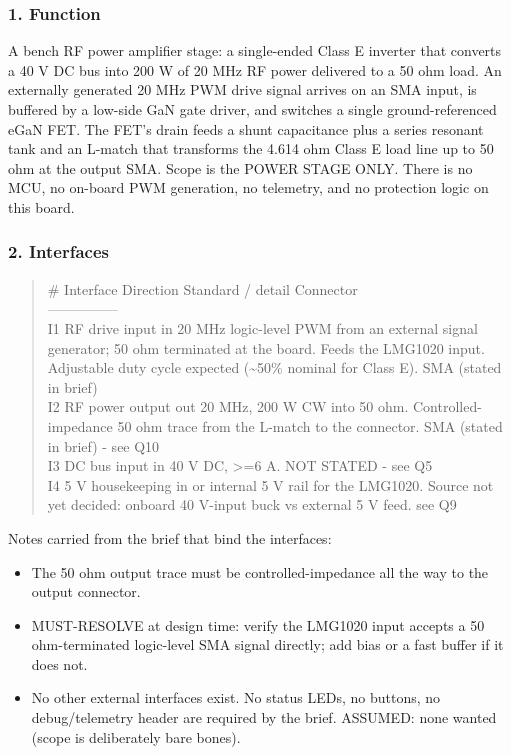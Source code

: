 \documentclass[11pt,a4paper]{article}
\begin{document}
\subsubsection*{1. Function}
A bench RF power amplifier stage: a single-ended Class E inverter that converts a 40 V DC bus into 200 W of 20 MHz RF power delivered to a 50 ohm load. An externally generated 20 MHz PWM drive signal arrives on an SMA input, is buffered by a low-side GaN gate driver, and switches a single ground-referenced eGaN FET. The FET's drain feeds a shunt capacitance plus a series resonant tank and an L-match that transforms the 4.614 ohm Class E load line up to 50 ohm at the output SMA. Scope is the POWER STAGE ONLY. There is no MCU, no on-board PWM generation, no telemetry, and no protection logic on this board.

\subsubsection*{2. Interfaces}
\begin{quote}\small\ttfamily\raggedright
\textbar{} \# \textbar{} Interface \textbar{} Direction \textbar{} Standard / detail \textbar{} Connector \textbar{}\\
\textbar{}---\textbar{}---\textbar{}---\textbar{}---\textbar{}---\textbar{}\\
\textbar{} I1 \textbar{} RF drive input \textbar{} in \textbar{} 20 MHz logic-level PWM from an external signal generator; 50 ohm terminated at the board. Feeds the LMG1020 input. Adjustable duty cycle expected (\textasciitilde{}50\% nominal for Class E). \textbar{} SMA (stated in brief) \textbar{}\\
\textbar{} I2 \textbar{} RF power output \textbar{} out \textbar{} 20 MHz, 200 W CW into 50 ohm. Controlled-impedance 50 ohm trace from the L-match to the connector. \textbar{} SMA (stated in brief) - see Q10 \textbar{}\\
\textbar{} I3 \textbar{} DC bus input \textbar{} in \textbar{} 40 V DC, \textgreater{}=6 A. \textbar{} NOT STATED - see Q5 \textbar{}\\
\textbar{} I4 \textbar{} 5 V housekeeping \textbar{} in or internal \textbar{} 5 V rail for the LMG1020. Source not yet decided: onboard 40 V-input buck vs external 5 V feed. \textbar{} see Q9 \textbar{}
\end{quote}
Notes carried from the brief that bind the interfaces:

\begin{itemize}
\item The 50 ohm output trace must be controlled-impedance all the way to the output connector.
\item MUST-RESOLVE at design time: verify the LMG1020 input accepts a 50 ohm-terminated logic-level
SMA signal directly; add bias or a fast buffer if it does not.
\item No other external interfaces exist. No status LEDs, no buttons, no debug/telemetry header are
required by the brief. ASSUMED: none wanted (scope is deliberately bare bones).
\end{itemize}
\end{document}
